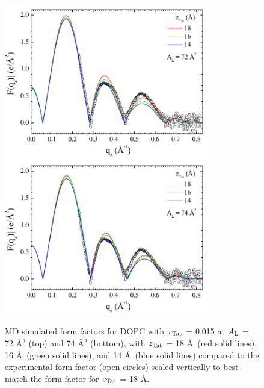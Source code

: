 \begin{figure}[p]
  \centering
  \includegraphics[width=0.8\textwidth]{figures/Tat/MD_Results/xff/dopc-tat2_72_sim-exp1}
  \includegraphics[width=0.8\textwidth]{figures/Tat/MD_Results/xff/dopc-tat2_74_sim-exp1}
  \caption{MD simulated form factors for DOPC with $x_\textrm{Tat}$ = 0.015 
  at $A_\textrm{L}$ = 72 \AA$^2$ (top) and 74 \AA$^2$ (bottom),
  with $z_\textrm{Tat}$ = 18 \AA\ (red solid lines), 16 \AA\ (green solid lines), 
  and 14 \AA\ (blue solid lines) compared to the experimental form factor 
  (open circles) scaled vertically to best match the form factor for 
  $z_\textrm{Tat}$ = 18 \AA.}
  \label{fig:MD_dopc-tat2_sim-exp}
\end{figure}

